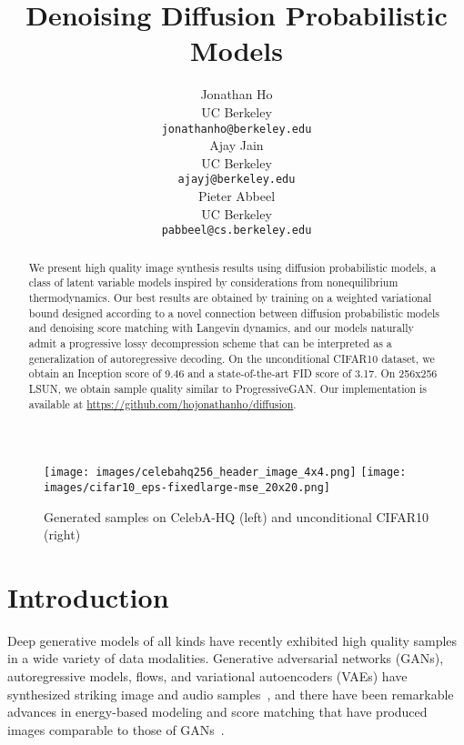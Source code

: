 \documentclass{article}
\title{Denoising Diffusion Probabilistic Models}
\author{Jonathan Ho \\
  UC Berkeley \\
  \texttt{jonathanho@berkeley.edu} \\
   \And
  Ajay Jain \\
  UC Berkeley \\
  \texttt{ajayj@berkeley.edu} \\
   \And
  Pieter Abbeel \\
  UC Berkeley \\
  \texttt{pabbeel@cs.berkeley.edu}
}
\begin{document}
\begin{figure}[b!]
  \vspace{-1em}
  \centering
  \texttt{[image: images/celebahq256\_header\_image\_4x4.png]}\hfill
  \texttt{[image: images/cifar10\_eps-fixedlarge-mse\_20x20.png]}
  \caption{\small{Generated samples on CelebA-HQ  (left) and unconditional CIFAR10 (right)}}
  \label{fig:header_samples}
\end{figure}


\maketitle

\begin{abstract}
We present high quality image synthesis results using diffusion probabilistic models, a class of latent variable models inspired by considerations from nonequilibrium thermodynamics. Our best results are obtained by training on a weighted variational bound designed according to a novel connection between diffusion probabilistic models and denoising score matching with Langevin dynamics, and our models naturally admit a progressive lossy decompression scheme that can be interpreted as a generalization of autoregressive decoding. On the unconditional CIFAR10 dataset, we obtain an Inception score of 9.46 and a state-of-the-art FID score of 3.17. On 256x256 LSUN, we obtain sample quality similar to ProgressiveGAN. Our implementation is available at \url{https://github.com/hojonathanho/diffusion}.
\end{abstract}

\section{Introduction}

Deep generative models of all kinds have recently exhibited high quality samples in a wide variety of data modalities. Generative adversarial networks (GANs), autoregressive models, flows, and variational autoencoders (VAEs) have synthesized striking image and audio samples~\citep{goodfellow2014generative,karras2018progressive,brock2018large,oord2016pixel,menick2018generating,kalchbrenner2017video,dinh2016density,kingma2018glow,prenger2019waveglow,oord2016wavenet,kalchbrenner2018efficient,kingma2013auto,razavi2019generating}, and there have been remarkable advances in energy-based modeling and score matching that have produced images comparable to those of GANs~\citep{du2019implicit,song2019generative}.
\end{document}
